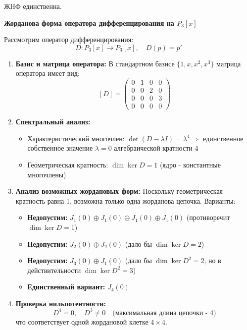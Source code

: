 \documentclass[12pt]{article}
\begin{document}
\begin{remarkbox}
    ЖНФ единственна.
\end{remarkbox}

\begin{examplebox}
\textbf{Жорданова форма оператора дифференцирования на $P_3[x]$}

Рассмотрим оператор дифференцирования:
\[ D: P_3[x] \to P_3[x], \quad D(p) = p' \]

\begin{enumerate}
    \item \textbf{Базис и матрица оператора:}
    В стандартном базисе $\{1, x, x^2, x^3\}$ матрица оператора имеет вид:
    \[
    [D] = \begin{pmatrix}
        0 & 1 & 0 & 0 \\
        0 & 0 & 2 & 0 \\
        0 & 0 & 0 & 3 \\
        0 & 0 & 0 & 0
    \end{pmatrix}
    \]

    \item \textbf{Спектральный анализ:}
    \begin{itemize}
        \item Характеристический многочлен: $\det(D - \lambda I) = \lambda^4 \Rightarrow$  единственное собственное значение $\lambda = 0$ алгебраической кратности 4
        \item Геометрическая кратность: $\dim \ker D = 1$ (ядро - константные многочлены)
    \end{itemize}

    \item \textbf{Анализ возможных жордановых форм:}
    Поскольку геометрическая кратность равна 1, возможна только одна жорданова цепочка. Варианты:
    \begin{itemize}
        \item \textbf{Недопустим:} $J_1(0) \oplus J_1(0) \oplus J_1(0) \oplus J_1(0)$ (противоречит $\dim \ker D = 1$)
        \item \textbf{Недопустим:} $J_2(0) \oplus J_2(0)$ (дало бы $\dim \ker D = 2$)
        \item \textbf{Недопустим:} $J_3(0) \oplus J_1(0)$ (дало бы $\dim \ker D^2 = 2$, но в действительности $\dim \ker D^2 = 3$)
        \item \textbf{Единственный вариант:} $J_4(0)$
    \end{itemize}

    \item \textbf{Проверка нильпотентности:}
    \[
    D^4 = 0, \quad D^3 \neq 0 \quad \text{(максимальная длина цепочки - 4)}
    \]
    что соответствует одной жордановой клетке $4\times4$.


\end{enumerate}
\end{examplebox}
\end{document}
